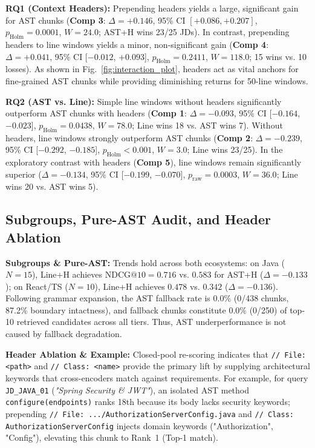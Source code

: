 

\textbf{RQ1 (Context Headers):} Prepending headers yields a large, significant gain for AST chunks (\textbf{Comp 3}: $\Delta = +0.146$, 95\% CI $[+0.086, +0.207]$, $p_{\mathrm{Holm}} = 0.0001$, $W = 24.0$; AST+H wins 23/25 JDs). In contrast, prepending headers to line windows yields a minor, non-significant gain (\textbf{Comp 4}: $\Delta = +0.041$, 95\% CI [$-0.012$, $+0.093$], $p_{\mathrm{Holm}} = 0.2411$, $W = 118.0$; 15 wins vs. 10 losses). As shown in Fig.~\ref{fig:interaction_plot}, headers act as vital anchors for fine-grained AST chunks while providing diminishing returns for 50-line windows.

\textbf{RQ2 (AST vs. Line):} Simple line windows without headers significantly outperform AST chunks with headers (\textbf{Comp 1}: $\Delta = -0.093$, 95\% CI [$-0.164$, $-0.023$], $p_{\mathrm{Holm}} = 0.0438$, $W = 78.0$; Line wins 18 vs. AST wins 7). Without headers, line windows strongly outperform AST chunks (\textbf{Comp 2}: $\Delta = -0.239$, 95\% CI [$-0.292$, $-0.185$], $p_{\mathrm{Holm}} < 0.001$, $W = 3.0$; Line wins 23/25). In the exploratory contrast with headers (\textbf{Comp 5}), line windows remain significantly superior ($\Delta = -0.134$, 95\% CI [$-0.199$, $-0.070$], $p_{\mathrm{raw}} = 0.0003$, $W = 36.0$; Line wins 20 vs. AST wins 5).

\subsection{Subgroups, Pure-AST Audit, and Header Ablation}
\label{sec:results:sensitivity}
\textbf{Subgroups \& Pure-AST:} Trends hold across both ecosystems: on Java ($N=15$), Line+H achieves $\text{NDCG@10} = 0.716$ vs. $0.583$ for AST+H ($\Delta = -0.133$); on React/TS ($N=10$), Line+H achieves $0.478$ vs. $0.342$ ($\Delta = -0.136$). Following grammar expansion, the AST fallback rate is $0.0\%$ (0/438 chunks, 87.2\% boundary intactness), and fallback chunks constitute $0.0\%$ (0/250) of top-10 retrieved candidates across all tiers. Thus, AST underperformance is not caused by fallback degradation.

\textbf{Header Ablation \& Example:} Closed-pool re-scoring indicates that \texttt{// File: <path>} and \texttt{// Class: <name>} provide the primary lift by supplying architectural keywords that cross-encoders match against requirements. For example, for query \texttt{JD\_JAVA\_01} (\textit{"Spring Security \& JWT"}), an isolated AST method \texttt{configure(endpoints)} ranks 18th because its body lacks security keywords; prepending \texttt{// File: .../AuthorizationServerConfig.java} and \texttt{// Class: AuthorizationServerConfig} injects domain keywords ("Authorization", "Config"), elevating this chunk to Rank~1 (Top-1 match).
